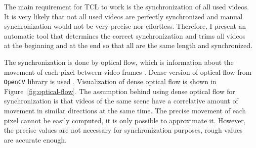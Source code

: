 The main requirement for TCL to work is the synchronization of all used videos. It is very likely that not all used videos are perfectly synchronized and manual synchronization would not be very precise nor effortless. Therefore, I present an automatic tool that determines the correct synchronization and trims all videos at the beginning and at the end so that all are the same length and synchronized.

The synchronization is done by optical flow, which is information about the movement of each pixel between video frames \cite{HORN1981185}. Dense version of optical flow from \texttt{OpenCV} library is used \cite{LearningOpenCV}. Visualization of dense optical flow is shown in Figure~\ref{fig:optical-flow}. The assumption behind using dense optical flow for synchronization is that videos of the same scene have a correlative amount of movement in similar directions at the same time. The precise movement of each pixel cannot be easily computed, it is only possible to approximate it. However, the precise values are not necessary for synchronization purposes, rough values are accurate enough.

